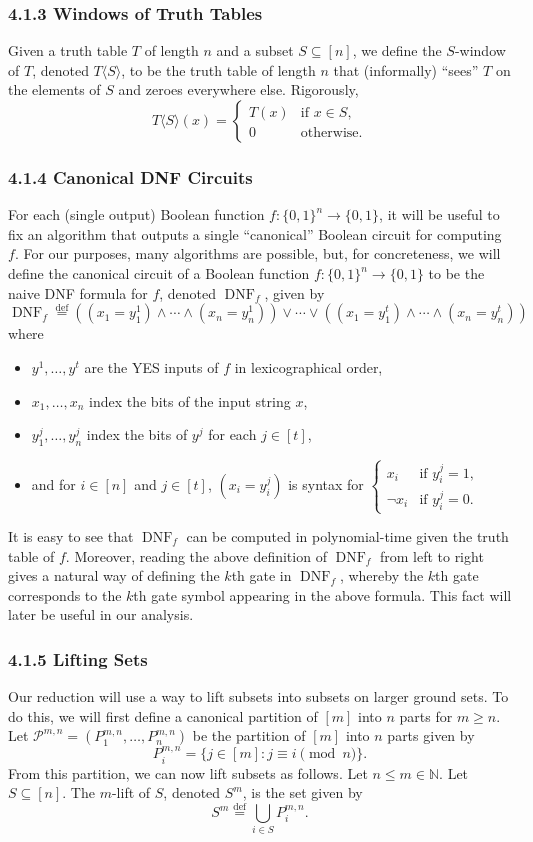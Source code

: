 \subsubsection*{4.1.3 Windows of Truth Tables}
Given a truth table $T$ of length $n$ and a subset $S\subseteq[n]$, we define the $S$-window of $T$, denoted $T\langle S\rangle$, to be the truth table of length $n$ that (informally) ``sees'' $T$ on the elements of $S$ and zeroes everywhere else. Rigorously,
\[T\langle S\rangle(x)=\begin{cases}T(x)&\text{if }x\in S,\\0&\text{otherwise}.\end{cases}\]
\subsubsection*{4.1.4 Canonical DNF Circuits}
For each (single output) Boolean function $f:\{0,1\}^n\to\{0,1\}$, it will be useful to fix an algorithm that outputs a single ``canonical'' Boolean circuit for computing $f$.
For our purposes, many algorithms are possible, but, for concreteness, we will define the canonical circuit of a Boolean function $f:\{0,1\}^n\to\{0,1\}$ to be the naive DNF formula for $f$, denoted $\operatorname{DNF}_f$, given by
\[\operatorname{DNF}_f\stackrel{\mathrm{def}}=((x_1=y_1^1)\land\cdots\land(x_n=y_n^1))\lor\cdots\lor((x_1=y_1^t)\land\cdots\land(x_n=y_n^t))\]
where
\begin{itemize}
\item $y^1,\ldots,y^t$ are the YES inputs of $f$ in lexicographical order,
\item $x_1,\ldots,x_n$ index the bits of the input string $x$,
\item $y_1^j,\ldots,y_n^j$ index the bits of $y^j$ for each $j\in[t]$,
\item and for $i\in[n]$ and $j\in[t]$, $(x_i=y_i^j)$ is syntax for $\begin{cases}x_i&\text{if }y_i^j=1,\\\neg x_i&\text{if }y_i^j=0.\end{cases}$
\end{itemize}
It is easy to see that $\operatorname{DNF}_f$ can be computed in polynomial-time given the truth table of $f$.
Moreover, reading the above definition of $\operatorname{DNF}_f$ from left to right gives a natural way of defining the $k$th gate in $\operatorname{DNF}_f$, whereby the $k$th gate corresponds to the $k$th gate symbol appearing in the above formula. This fact will later be useful in our analysis.
\subsubsection*{4.1.5 Lifting Sets}
Our reduction will use a way to lift subsets into subsets on larger ground sets. To do this, we will first define a canonical partition of $[m]$ into $n$ parts for $m\geq n$. Let $\mathcal P^{m,n}=(P_1^{m,n},\ldots,P_n^{m,n})$ be the partition of $[m]$ into $n$ parts given by
\[P_i^{m,n}=\{j\in[m]:j\equiv i\pmod n\}.\]
From this partition, we can now lift subsets as follows. Let $n\leq m\in\mathbb N$. Let $S\subseteq[n]$. The $m$-lift of $S$, denoted $S^m$, is the set given by
\[S^m\stackrel{\mathrm{def}}=\bigcup_{i\in S}P_i^{m,n}.\]
